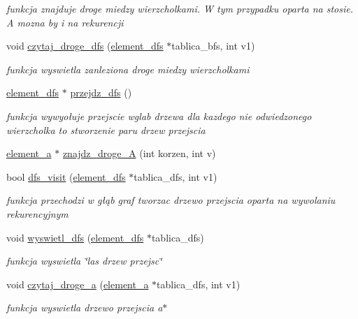 \begin{DoxyCompactItemize}
\begin{DoxyCompactList}\small\item\em funkcja znajduje droge miedzy wierzcholkami. \-W tym przypadku oparta na stosie. \-A mozna by i na rekurencji \end{DoxyCompactList}\item 
void \hyperlink{classgraf_ac5e916e9b4f36cd6949ee8132e044e9c}{czytaj\-\_\-droge\-\_\-dfs} (\hyperlink{structelement__dfs}{element\-\_\-dfs} $\ast$tablica\-\_\-bfs, int v1)
\begin{DoxyCompactList}\small\item\em funkcja wyswietla zanleziona droge miedzy wierzcholkami \end{DoxyCompactList}\item 
\hyperlink{structelement__dfs}{element\-\_\-dfs} $\ast$ \hyperlink{classgraf_a1a4c08e7c698459b7ceb172fd687dc78}{przejdz\-\_\-dfs} ()
\begin{DoxyCompactList}\small\item\em funkcja wywyołuje przejscie wglab drzewa dla kazdego nie odwiedzonego wierzcholka  to stworzenie paru drzew przejscia \end{DoxyCompactList}\item 
\hyperlink{structelement__a}{element\-\_\-a} $\ast$ \hyperlink{classgraf_a11b9a4982bc85f888ff570875b65bba0}{znajdz\-\_\-droge\-\_\-\-A} (int korzen, int v)
\item 
bool \hyperlink{classgraf_a16090538c8c5c1414f3eb45d754ec2cc}{dfs\-\_\-visit} (\hyperlink{structelement__dfs}{element\-\_\-dfs} $\ast$tablica\-\_\-dfs, int v1)
\begin{DoxyCompactList}\small\item\em funkcja przechodzi w głąb graf tworzac drzewo przejscia oparta na wywolaniu rekurencyjnym \end{DoxyCompactList}\item 
void \hyperlink{classgraf_a5b26730ff96f99be35adef3c706a1d72}{wyswietl\-\_\-dfs} (\hyperlink{structelement__dfs}{element\-\_\-dfs} $\ast$tablica\-\_\-dfs)
\begin{DoxyCompactList}\small\item\em funkcja wyswietla \char`\"{}las drzew przejsc\char`\"{} \end{DoxyCompactList}\item 
void \hyperlink{classgraf_a2731ba6f5c2d4f02755b66cc0eaec693}{czytaj\-\_\-droge\-\_\-a} (\hyperlink{structelement__a}{element\-\_\-a} $\ast$tablica\-\_\-dfs, int v1)
\begin{DoxyCompactList}\small\item\em funkcja wyswietla drzewo przejscia a$\ast$ \end{DoxyCompactList}\end{DoxyCompactItemize}

